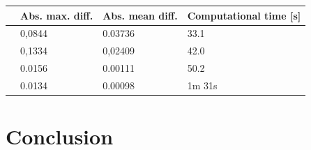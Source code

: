 \documentclass[a4paper, twocolumn]{article}
\begin{document}
\begin{strip}
\begin{center}
 \label{tab:NN_more_layers} 
    \begin{tabular}{| l | l | l | l |}
    \hline
    [$\text{layer}_{n}$,] & Abs. max. diff. & Abs. mean diff. & Computational time [s]\\ \hline
    [10,10] & 0,0844 & 0.03736 & 33.1 \\ \hline
    [10,10,10] & 0,1334 & 0,02409 & 42.0 \\ \hline
    [10,10,10,10] & 0.0156 & 0.00111 & 50.2 \\ \hline
    [90,90] & 0.0134 & 0.00098 & 1m 31s \\ 
    \hline
    \end{tabular} 
\end{center}
\end{strip}

\section{Conclusion}
\lipsum[7]


\onecolumn{
\printbibliography
}
\end{document}
